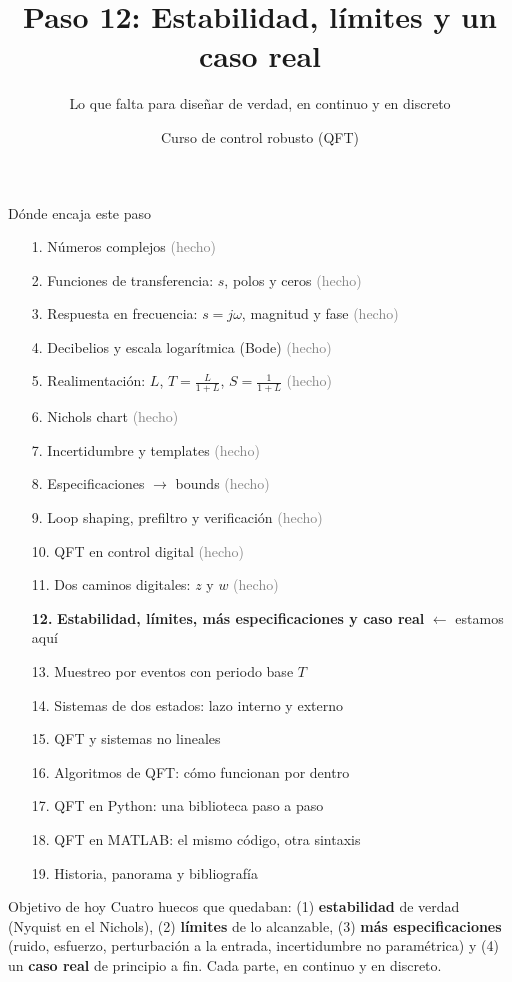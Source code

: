 \documentclass[aspectratio=169,11pt]{beamer}
\title[Estabilidad, límites y caso real]{Paso 12: Estabilidad, límites y un caso real}
\subtitle{Lo que falta para diseñar de verdad, en continuo y en discreto}
\author{Curso de control robusto (QFT)}
\date{}
\begin{document}
\begin{frame}\titlepage\end{frame}

\begin{frame}{Dónde encaja este paso}
  \tiny
  \begin{enumerate}\setlength{\itemsep}{-2pt}
    \item[1.] Números complejos \hfill \textcolor{gray}{(hecho)}
    \item[2.] Funciones de transferencia: $s$, polos y ceros \hfill \textcolor{gray}{(hecho)}
    \item[3.] Respuesta en frecuencia: $s=j\omega$, magnitud y fase \hfill \textcolor{gray}{(hecho)}
    \item[4.] Decibelios y escala logarítmica (Bode) \hfill \textcolor{gray}{(hecho)}
    \item[5.] Realimentación: $L$, $T=\frac{L}{1+L}$, $S=\frac{1}{1+L}$ \hfill \textcolor{gray}{(hecho)}
    \item[6.] Nichols chart \hfill \textcolor{gray}{(hecho)}
    \item[7.] Incertidumbre y templates \hfill \textcolor{gray}{(hecho)}
    \item[8.] Especificaciones $\rightarrow$ bounds \hfill \textcolor{gray}{(hecho)}
    \item[9.] Loop shaping, prefiltro y verificación \hfill \textcolor{gray}{(hecho)}
    \item[10.] QFT en control digital \hfill \textcolor{gray}{(hecho)}
    \item[11.] Dos caminos digitales: $z$ y $w$ \hfill \textcolor{gray}{(hecho)}
    \item[\textbf{12.}] \textbf{Estabilidad, límites, más especificaciones y caso real} \hfill $\leftarrow$ estamos aquí
    \item[13.] Muestreo por eventos con periodo base $T$
    \item[14.] Sistemas de dos estados: lazo interno y externo
    \item[15.] QFT y sistemas no lineales
    \item[16.] Algoritmos de QFT: cómo funcionan por dentro
    \item[17.] QFT en Python: una biblioteca paso a paso
    \item[18.] QFT en MATLAB: el mismo código, otra sintaxis
    \item[19.] Historia, panorama y bibliografía
  \end{enumerate}
  \vspace{2pt}
  \begin{block}{Objetivo de hoy}
    Cuatro huecos que quedaban: (1) \textbf{estabilidad} de verdad (Nyquist en el Nichols), (2) \textbf{límites} de lo alcanzable, (3) \textbf{más especificaciones} (ruido, esfuerzo, perturbación a la entrada, incertidumbre no paramétrica) y (4) un \textbf{caso real} de principio a fin. Cada parte, en continuo y en discreto.
  \end{block}
\end{frame}
\end{document}
